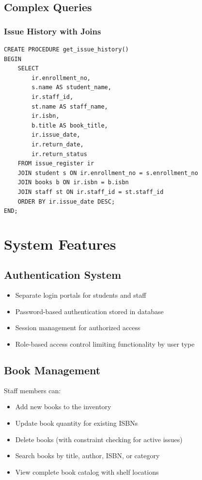 \documentclass[12pt,a4paper]{article}
\newenvironment{keyfeatures}
{%
  \begin{tcolorbox}[
    colback=lightgray,
    colframe=accentblue,
    title={\faLightbulb\ Key Features},
    fonttitle=\bfseries,
    left=10pt,
    right=10pt,
    breakable
  ]
}{%
  \end{tcolorbox}
}
\begin{document}
\subsection{Complex Queries}

\subsubsection{Issue History with Joins}

\begin{lstlisting}[caption=Complete Issue History Query]
CREATE PROCEDURE get_issue_history()
BEGIN
    SELECT
        ir.enrollment_no,
        s.name AS student_name,
        ir.staff_id,
        st.name AS staff_name,
        ir.isbn,
        b.title AS book_title,
        ir.issue_date,
        ir.return_date,
        ir.return_status
    FROM issue_register ir
    JOIN student s ON ir.enrollment_no = s.enrollment_no
    JOIN books b ON ir.isbn = b.isbn
    JOIN staff st ON ir.staff_id = st.staff_id
    ORDER BY ir.issue_date DESC;
END;
\end{lstlisting}

\section{System Features}

\subsection{Authentication System}

\begin{keyfeatures}
\begin{itemize}
    \item Separate login portals for students and staff
    \item Password-based authentication stored in database
    \item Session management for authorized access
    \item Role-based access control limiting functionality by user type
\end{itemize}
\end{keyfeatures}

\subsection{Book Management}

Staff members can:
\begin{itemize}
    \item Add new books to the inventory
    \item Update book quantity for existing ISBNs
    \item Delete books (with constraint checking for active issues)
    \item Search books by title, author, ISBN, or category
    \item View complete book catalog with shelf locations
\end{itemize}
\end{document}
